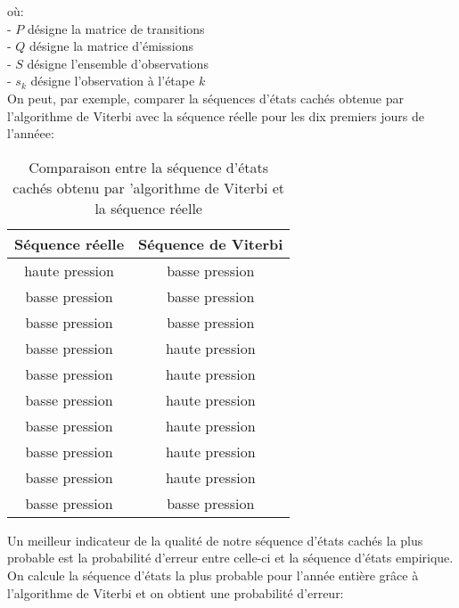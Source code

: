 \documentclass{article}
\begin{document}
\begin{multicols}{2}
où: \\
    - $P$ désigne la matrice de transitions \\
    - $Q$ désigne la matrice d'émissions \\
    - $S$ désigne l'ensemble d'observations \\
    - $s_k$ désigne l'observation à l'étape $k$ \\

On peut, par exemple, comparer la séquences d'états cachés obtenue par
l'algorithme de Viterbi avec la séquence réelle pour les dix premiers jours de
l'annéee:

\begin{table}[H]
    \begin{center}
        \centering
        \captionsetup{justification=centering}
        \caption{\label{tab:fwdbwd}Comparaison entre la séquence d'états cachés obtenu par 'algorithme de Viterbi et la séquence réelle}
        \begin{tabular}{|c|c|}
            \hline
            Séquence réelle & Séquence de Viterbi \\
            \hline
            haute pression & basse pression \\
            basse pression & basse pression \\
            basse pression & basse pression \\
            basse pression & haute pression \\
            basse pression & haute pression \\
            basse pression & haute pression \\
            basse pression & haute pression \\
            basse pression & haute pression \\
            basse pression & haute pression \\
            basse pression & basse pression \\
            \hline
        \end{tabular}
    \end{center}
\end{table}

Un meilleur indicateur de la qualité de notre séquence d'états cachés la plus
probable est la probabilité d'erreur entre celle-ci et la séquence d'états
empirique. On calcule la séquence d'états la plus probable pour l'année entière
grâce à l'algorithme de Viterbi et on obtient une probabilité d'erreur:


\end{multicols}
\end{document}
